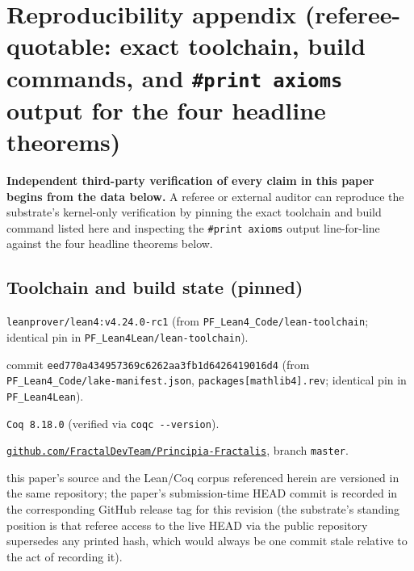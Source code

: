 \documentclass[11pt,a4paper]{amsart}
\theoremstyle{plain}
\theoremstyle{definition}
\begin{document}
\appendix
\section{Reproducibility appendix (referee-quotable: exact toolchain, build commands, and \texttt{\#print axioms} output for the four headline theorems)}\label{sec:reproducibility-appendix}

\textbf{Independent third-party verification of every claim in this paper begins from the data below.} A referee or external auditor can reproduce the substrate's kernel-only verification by pinning the exact toolchain and build command listed here and inspecting the \texttt{\#print axioms} output line-for-line against the four headline theorems below.

\subsection{Toolchain and build state (pinned)}\label{subsec:repro-toolchain}

\begin{description}[font=\normalfont\bfseries,leftmargin=2em,itemsep=2pt]
\item[Lean toolchain] \texttt{leanprover/lean4:v4.24.0-rc1} (from \texttt{PF\_Lean4\_Code/lean-toolchain}; identical pin in \texttt{PF\_Lean4Lean/lean-toolchain}).
\item[mathlib revision] commit \texttt{eed770a434957369c6262aa3fb1d6426419016d4} (from \texttt{PF\_Lean4\_Code/lake-manifest.json}, \texttt{packages[mathlib4].rev}; identical pin in \texttt{PF\_Lean4Lean}).
\item[Coq version] \texttt{Coq 8.18.0} (verified via \texttt{coqc -{}-version}).
\item[Repository] \href{https://github.com/FractalDevTeam/Principia-Fractalis}{\texttt{github.com/FractalDevTeam/Principia-Fractalis}}, branch \texttt{master}.
\item[Paper-revision HEAD at submission] this paper's source and the Lean/Coq corpus referenced herein are versioned in the same repository; the paper's submission-time HEAD commit is recorded in the corresponding GitHub release tag for this revision (the substrate's standing position is that referee access to the live HEAD via the public repository supersedes any printed hash, which would always be one commit stale relative to the act of recording it).
\end{description}
\end{document}
